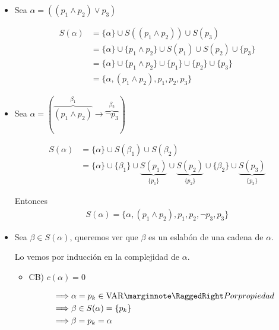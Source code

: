 \begin{itemize}
    \item Sea $\alpha = ((p_1 \wedge p_2) \vee p_3)$

    \begin{align*}
        S(\alpha) &= \{\alpha\} \cup S((p_1 \wedge p_2)) \cup S(p_3) \\
                  &= \{\alpha\} \cup \{p_1 \wedge p_2\} \cup S(p_1) 
                  \cup S(p_2) \cup \{p_3\} \\
                  &= \{\alpha\} \cup \{p_1 \wedge p_2\} \cup \{p_1\} 
                  \cup \{p_2\} \cup \{p_3\} \\
                  &= \{ \alpha, (p_1 \wedge p_2), p_1, p_2, p_3 \}
    \end{align*}

    \item Sea $\alpha = (\overbrace{(p_1 \wedge p_2)}^{\beta_1} 
        \to \overbrace{\neg p_3}^{\beta_2})$

        \begin{align*}
            S(\alpha) &= \{ \alpha \} \cup S(\beta_1) \cup S(\beta_2) \\
            &= \{ \alpha \} \cup \{ \beta_1 \} 
            \cup \underbrace{S(p_1)}_{\{ p_1 \}} 
            \cup \underbrace{S(p_2)}_{\{ p_2 \}} 
            \cup \{ \beta_2 \} \cup \underbrace{S(p_3)}_{\{ p_3 \}}
        \end{align*}

        Entonces
        \begin{gather*}
            S(\alpha) = \{\alpha, (p_1\wedge p_2), p_1, p_2,\neg p_3, p_3 \}
        \end{gather*}

    \item Sea $\beta \in S(\alpha)$, queremos ver que $\beta$ es un eslabón de
    una cadena de $\alpha$.

    \medskip
    Lo vemos por inducción en la complejidad de $\alpha$.

    \begin{itemize}
        \item CB) $c(\alpha) = 0$

            \begin{align*}
                \implies& \alpha = p_k \in \mathrm{VAR}
                \nota{Por propiedad} \\
                \implies& \beta \in S(\alpha) = \{ p_k \} \\
                \implies& \beta = p_k = \alpha
            \end{align*}


\end{itemize}
\end{itemize}
